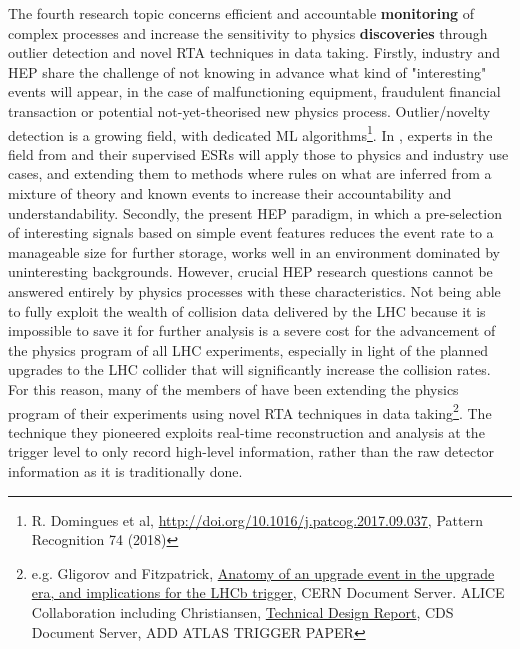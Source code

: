 The fourth research topic concerns efficient and accountable \textbf{monitoring} of complex processes and increase the sensitivity to physics \textbf{discoveries} through outlier detection and novel RTA techniques in data taking. 
Firstly, industry and HEP share the challenge of not knowing in advance what kind of "interesting" events will appear, in the case of malfunctioning equipment, fraudulent financial transaction or potential not-yet-theorised new physics process. 
Outlier/novelty detection is a growing field, with dedicated ML algorithms\footnote{R. Domingues et al, \href{A comparative evaluation of outlier detection algorithms: experiments and analyses}{http://doi.org/10.1016/j.patcog.2017.09.037}, Pattern Recognition 74 (2018)}. In \acronym, experts in the field from \ibmentity and their supervised ESRs will apply those to physics and industry use cases, and extending them to methods where rules on what are inferred from a mixture of theory and known events to increase their accountability and understandability. 
Secondly, the present HEP paradigm, in which a pre-selection of interesting signals based on simple event features reduces the event rate to a manageable size for further storage, works well in an environment dominated by uninteresting backgrounds. 
However, crucial HEP research questions cannot be answered entirely by physics processes with these characteristics. Not being able to fully exploit the wealth of collision data delivered by the LHC because it is impossible to save it for further analysis is a severe cost for the advancement of the physics program of all LHC experiments, especially in light of the planned upgrades to the LHC collider that will significantly increase the collision rates. For this reason, many of the members of \acronym have been extending the physics program of their experiments using novel RTA techniques in data taking\footnote{e.g. Gligorov and Fitzpatrick, \href{http://cds.cern.ch/record/1670985}{Anatomy of an upgrade event in the upgrade era, and implications for the LHCb trigger}, CERN Document Server. ALICE Collaboration including Christiansen, \href{https://cds.cern.ch/record/2011297/files/ALICE-TDR-019.pdf}{Technical Design Report}, CDS Document Server, ADD ATLAS TRIGGER PAPER}. 
The technique they pioneered exploits real-time reconstruction and analysis at the trigger level to only record high-level  information, rather than the raw detector information as it is traditionally done. 

